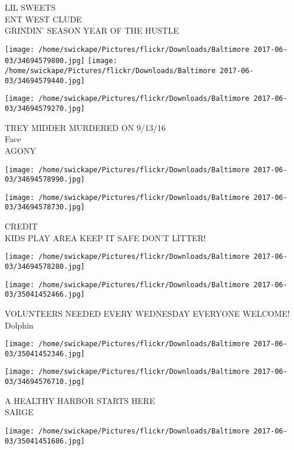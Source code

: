 \documentclass[10pt,letterpaper]{article}
\begin{document}
LIL SWEETS\\
ENT WEST CLUDE\\
GRINDIN' SEASON YEAR OF THE HUSTLE\\
\pagebreak

\texttt{[image: /home/swickape/Pictures/flickr/Downloads/Baltimore 2017-06-03/34694579800.jpg]}
\texttt{[image: /home/swickape/Pictures/flickr/Downloads/Baltimore 2017-06-03/34694579440.jpg]}

\texttt{[image: /home/swickape/Pictures/flickr/Downloads/Baltimore 2017-06-03/34694579270.jpg]}

TREY MIDDER MURDERED ON 9/13/16\\
Face\\
AGONY\\
\pagebreak

\texttt{[image: /home/swickape/Pictures/flickr/Downloads/Baltimore 2017-06-03/34694578990.jpg]}

\vspace{0.25in}
\texttt{[image: /home/swickape/Pictures/flickr/Downloads/Baltimore 2017-06-03/34694578730.jpg]}

CREDIT\\
KIDS PLAY AREA KEEP IT SAFE DON'T LITTER!\\
\pagebreak

\texttt{[image: /home/swickape/Pictures/flickr/Downloads/Baltimore 2017-06-03/34694578280.jpg]}

\vspace{0.25in}
\texttt{[image: /home/swickape/Pictures/flickr/Downloads/Baltimore 2017-06-03/35041452466.jpg]}

VOLUNTEERS NEEDED EVERY WEDNESDAY EVERYONE WELCOME!\\
Dolphin\\
\pagebreak

\texttt{[image: /home/swickape/Pictures/flickr/Downloads/Baltimore 2017-06-03/35041452346.jpg]}

\vspace{0.25in}
\texttt{[image: /home/swickape/Pictures/flickr/Downloads/Baltimore 2017-06-03/34694576710.jpg]}

A HEALTHY HARBOR STARTS HERE\\
SARGE\\
\pagebreak

\texttt{[image: /home/swickape/Pictures/flickr/Downloads/Baltimore 2017-06-03/35041451686.jpg]}
\end{document}
